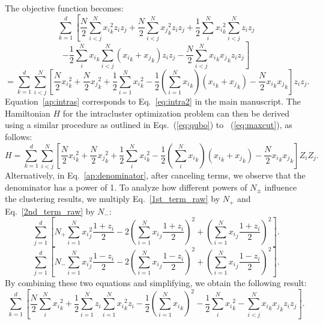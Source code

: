 \documentclass[showpacs,twocolumn,superscriptaddress]{revtex4-2}
\begin{document}
The objective function becomes:
\begin{equation}
    \sum_{k=1}^d \left[\frac{N}{2}\sum_{i<j}^N {x_i}_k^2 z_iz_j + \frac{N}{2}\sum_{i<j}^N {x_j}_k^2z_iz_j + \frac{1}{2}\sum_i^N{x_i}_k^2\sum_{i<j}^Nz_iz_j \right. \nonumber
\end{equation}
\begin{equation}
    \left.-\frac{1}{2}\sum_i^N{x_i}_k\sum_{i<j}^N\left({x_i}_k+{x_j}_k\right)z_iz_j -\frac{N}{2}\sum_{i<j}^N{x_i}_k{x_j}_kz_iz_j \right]
\end{equation}
\begin{equation}\label{ap:intras}
    =\sum_{k=1}^d \sum_{i<j}^N \left[\frac{N}{2}{x_i}_k^2 + \frac{N}{2}{x_j}_k^2 + \frac{1}{2}\sum_{i=1}^N{x_i}_k^2-\frac{1}{2}\left(\sum_{i=1}^N{x_i}_k\right)\left({x_i}_k+{x_j}_k\right)-\frac{N}{2}{x_i}_k{x_j}_k\right]z_iz_j.
\end{equation}
Equation~\eqref{ap:intras} corresponds to Eq.~\eqref{eq:intra2} in the main manuscript. The Hamiltonian $H$ for the intracluster optimization problem can then be derived using a similar procedure as outlined in Eqs.~(\ref{eq:qubo}) to ~(\ref{eq:maxcut}), as follows:
\begin{equation}
    H=\sum_{k=1}^d \sum_{i<j}^N \left[\frac{N}{2}{x_i}_k^2 + \frac{N}{2}{x_j}_k^2 + \frac{1}{2}\sum_i^N{x_i}_k^2-\frac{1}{2}\left(\sum_i^N{x_i}_k\right)\left({x_i}_k+{x_j}_k\right)-\frac{N}{2}{x_i}_k{x_j}_k\right]Z_iZ_j.
\end{equation}
Alternatively, in Eq.~\eqref{ap:denominator}, after canceling terms, we observe that the denominator has a power of 1. To analyze how different powers of $N_{\pm}$ influence the clustering results, we multiply Eq.~\eqref{1st_term_raw} by $N_+$ and Eq.~\eqref{2nd_term_raw} by $N_-$:
\begin{equation}\label{eq42}
    \sum_{j=1}^d \left[N_{+}\sum_{i=1}^{N} {x_i}_j^2 \frac{1+z_i}{2} - 2 \left(\sum_{i=1}^N {x_i}_j \frac{1+z_i}{2}\right)^2 + \left(\sum_{i=1}^N {x_i}_j \frac{1+z_i}{2}\right)^2 \right].
\end{equation}
\begin{equation}\label{eq43}
        \sum_{j=1}^d \left[N_{-}\sum_{i=1}^{N} {x_i}_j^2 \frac{1-z_i}{2} - 2\left(\sum_{i=1}^N {x_i}_j \frac{1-z_i}{2}\right)^2 + \left(\sum_{i=1}^N {x_i}_j \frac{1-z_i}{2}\right)^2 \right].
\end{equation}
By combining these two equations and simplifying, we obtain the following result:
\begin{equation}
    \sum_{k=1}^d\left[\frac{N}{2}\sum_{i}^N {x_i}_k^2 + \frac{1}{2} \sum_{i=1}^{N} z_i \sum_{i=1}^N {x_i}_k^2 z_i - \frac{1}{2}\left(\sum_{i=1}^N {x_i}_k\right)^2 -\frac{1}{2}\sum_{i}^N {x_i}_k^2 - \sum_{i<j}^N {x_i}_k{x_j}_k  z_i z_j\right].
\end{equation}
\end{document}
